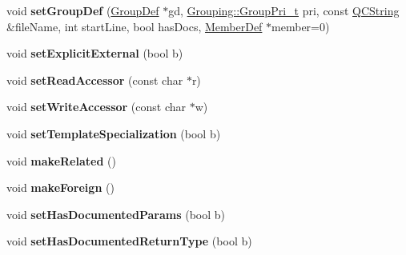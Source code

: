 \begin{DoxyCompactItemize}
\item 
\hypertarget{class_member_def_a34fe33a7a7a7d05a9c118c64d2ef7208}{void {\bfseries set\-Group\-Def} (\hyperlink{class_group_def}{Group\-Def} $\ast$gd, \hyperlink{struct_grouping_ae0be00a2b5dfbbc6c4558e88dddc9d81}{Grouping\-::\-Group\-Pri\-\_\-t} pri, const \hyperlink{class_q_c_string}{Q\-C\-String} \&file\-Name, int start\-Line, bool has\-Docs, \hyperlink{class_member_def}{Member\-Def} $\ast$member=0)}\label{class_member_def_a34fe33a7a7a7d05a9c118c64d2ef7208}

\item 
\hypertarget{class_member_def_a42bd4e948829380ac872e105d3ba728d}{void {\bfseries set\-Explicit\-External} (bool b)}\label{class_member_def_a42bd4e948829380ac872e105d3ba728d}

\item 
\hypertarget{class_member_def_a63f83e3624daf45fbb8434402897d1c3}{void {\bfseries set\-Read\-Accessor} (const char $\ast$r)}\label{class_member_def_a63f83e3624daf45fbb8434402897d1c3}

\item 
\hypertarget{class_member_def_a3d23938f0eed33a3131bdbbf8a04cfe9}{void {\bfseries set\-Write\-Accessor} (const char $\ast$w)}\label{class_member_def_a3d23938f0eed33a3131bdbbf8a04cfe9}

\item 
\hypertarget{class_member_def_a20653f6c472e3354b57e3bf1ebb00af7}{void {\bfseries set\-Template\-Specialization} (bool b)}\label{class_member_def_a20653f6c472e3354b57e3bf1ebb00af7}

\item 
\hypertarget{class_member_def_a0bca84ab5a332ff314c08cdec6e80646}{void {\bfseries make\-Related} ()}\label{class_member_def_a0bca84ab5a332ff314c08cdec6e80646}

\item 
\hypertarget{class_member_def_ae466a431c2ff05f45b757c53b81090f2}{void {\bfseries make\-Foreign} ()}\label{class_member_def_ae466a431c2ff05f45b757c53b81090f2}

\item 
\hypertarget{class_member_def_a8e3f1cdfdfb3a8da8de747988db419a3}{void {\bfseries set\-Has\-Documented\-Params} (bool b)}\label{class_member_def_a8e3f1cdfdfb3a8da8de747988db419a3}

\item 
\hypertarget{class_member_def_a0003c8229baa08e03abb9dd2ec21e285}{void {\bfseries set\-Has\-Documented\-Return\-Type} (bool b)}\label{class_member_def_a0003c8229baa08e03abb9dd2ec21e285}


\end{DoxyCompactItemize}
